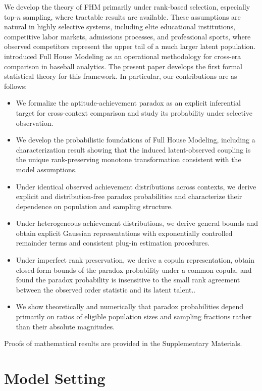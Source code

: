 \documentclass[12pt]{article}
\begin{document}
We develop the theory of FHM primarily under rank-based selection, especially top-$n$ sampling, where tractable results are available. These assumptions are natural in highly selective systems, including elite educational institutions, competitive labor markets, admissions processes, and professional sports, where observed competitors represent the upper tail of a much larger latent population. \citet{yan2025comparing} introduced Full House Modeling as an operational methodology for cross-era comparison in baseball analytics. The present paper develops the first formal statistical theory for this framework. In particular, our contributions are as follows:
\begin{itemize}
    \item We formalize the aptitude-achievement paradox as an explicit inferential target for cross-context comparison and study its probability under selective observation.
    \item We develop the probabilistic foundations of Full House Modeling, including a characterization result showing that the induced latent-observed coupling is the unique rank-preserving monotone transformation consistent with the model assumptions.
    \item Under identical observed achievement distributions across contexts, we derive explicit and distribution-free paradox probabilities and characterize their dependence on population and sampling structure.
	\item Under heterogeneous achievement distributions, we derive general bounds and obtain explicit Gaussian representations with exponentially controlled remainder terms and consistent plug-in estimation procedures.
	\item Under imperfect rank preservation, we derive a copula representation, obtain closed-form bounds of the paradox probability under a common copula, and found the paradox probability is insensitive to the small rank agreement between the observed order statistic and its latent talent.. 
    \item We show theoretically and numerically that paradox probabilities depend primarily on ratios of eligible population sizes and sampling fractions rather than their absolute magnitudes.
\end{itemize}

Proofs of mathematical results are provided in the Supplementary Materials.



\section{Model Setting}
\label{sec:modelsetting}
\end{document}
